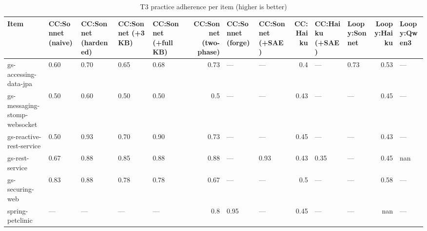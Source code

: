 \begin{table}[t]
\centering
\caption{T3 practice adherence per item (higher is better)}
\label{tab:per-item-breakdown}
\small
\begin{tabular}{lllllrllrllrl}
\toprule
 Item                         & CC:Sonnet (naive)   & CC:Sonnet (hardened)   & CC:Sonnet (+3 KB)   & CC:Sonnet (+full KB)   &   CC:Sonnet (two-phase) & CC:Sonnet (forge)   & CC:Sonnet (+SAE)   &   CC:Haiku & CC:Haiku (+SAE)   & Loopy:Sonnet   &   Loopy:Haiku & Loopy:Qwen3   \\
\midrule
 gs-accessing-data-jpa        & 0.60                & 0.70                   & 0.65                & 0.68                   &                    0.73 & ---                 & ---                &       0.4  & ---               & 0.73           &          0.53 & ---           \\
 gs-messaging-stomp-websocket & 0.50                & 0.60                   & 0.50                & 0.50                   &                    0.5  & ---                 & ---                &       0.43 & ---               & ---            &          0.45 & ---           \\
 gs-reactive-rest-service     & 0.50                & 0.93                   & 0.70                & 0.90                   &                    0.73 & ---                 & ---                &       0.45 & ---               & ---            &          0.43 & ---           \\
 gs-rest-service              & 0.67                & 0.88                   & 0.85                & 0.88                   &                    0.88 & ---                 & 0.93               &       0.43 & 0.35              & ---            &          0.45 & nan           \\
 gs-securing-web              & 0.83                & 0.88                   & 0.78                & 0.78                   &                    0.67 & ---                 & ---                &       0.5  & ---               & ---            &          0.58 & ---           \\
 spring-petclinic             & ---                 & ---                    & ---                 & ---                    &                    0.8  & 0.95                & ---                &       0.45 & ---               & ---            &        nan    & ---           \\
\bottomrule
\end{tabular}
\end{table}
